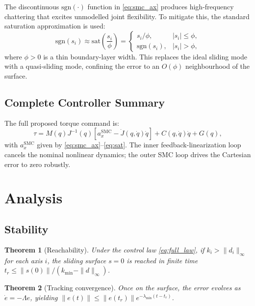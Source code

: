 \documentclass[11pt,a4paper]{article}
\newtheorem{theorem}{Theorem}[section]
\begin{document}
The discontinuous $\mathrm{sgn}(\cdot)$ function in \eqref{eq:smc_ax} produces
high-frequency chattering that excites unmodelled joint flexibility. To mitigate
this, the standard saturation approximation is used:
\begin{equation}
  \mathrm{sgn}(s_i) \approx \mathrm{sat}\!\left(\frac{s_i}{\phi}\right)
  =
  \begin{cases}
    s_i/\phi, & |s_i| \leq \phi,\\
    \mathrm{sgn}(s_i), & |s_i| > \phi,
  \end{cases}
  \label{eq:sat}
\end{equation}
where $\phi > 0$ is a thin boundary-layer width. This replaces the ideal
sliding mode with a quasi-sliding mode, confining the error to an $O(\phi)$
neighbourhood of the surface.

\subsection{Complete Controller Summary}

The full proposed torque command is:
\begin{equation}
  \tau = M(q)J^{-1}(q)\!\left[a_x^{\mathrm{SMC}} - \dot{J}(q,\dot{q})\dot{q}\right]
       + C(q,\dot{q})\dot{q} + G(q),
  \label{eq:full_law}
\end{equation}
with $a_x^{\mathrm{SMC}}$ given by \eqref{eq:smc_ax}--\eqref{eq:sat}. The
inner feedback-linearization loop cancels the nominal nonlinear dynamics; the
outer SMC loop drives the Cartesian error to zero robustly.

\section{Analysis}

\subsection{Stability}

\begin{theorem}[Reachability]
Under the control law \eqref{eq:full_law}, if $k_i > \|d_i\|_\infty$ for each
axis $i$, the sliding surface $s = 0$ is reached in finite time
$t_r \leq \|s(0)\| / (k_{\min} - \|d\|_\infty)$.
\end{theorem}

\begin{theorem}[Tracking convergence]
Once on the surface, the error evolves as $\dot{e} = -\Lambda e$, yielding
$\|e(t)\| \leq \|e(t_r)\|e^{-\lambda_{\min}(t - t_r)}$.
\end{theorem}
\end{document}
